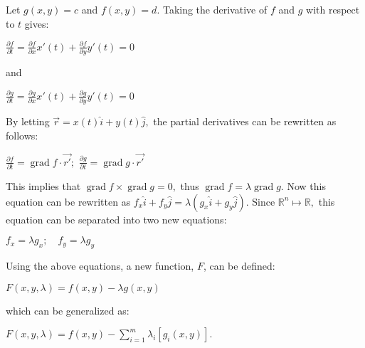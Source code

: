 \documentclass[12pt]{article}
\begin{document}
Let $g(x,y)=c$ and $f(x,y)=d$.  Taking the derivative of $f$ and $g$ with respect to $t$ gives:


\begin{center}$\displaystyle\frac{\partial f}{\partial t}=\frac{\partial f}{\partial x}x'(t)+\frac{\partial f}{\partial y}y'(t)=0$\end{center}

\begin{center}and\end{center}

\begin{center}$\displaystyle\frac{\partial g}{\partial t}=\frac{\partial g}{\partial x}x'(t)+\frac{\partial g}{\partial y}y'(t)=0$\end{center}

By letting $\vec{r}=x(t)\hat{i}+y(t)\hat{j},$ the partial derivatives can be rewritten as follows:

\begin{center}$\displaystyle\frac{\partial f}{\partial t}=\operatorname{grad} f\cdot \vec{r'};$ \quad $\displaystyle\frac{\partial g}{\partial t}=\operatorname{grad} g\cdot \vec{r'}$\end{center}

This implies that $\operatorname{grad} f \times \operatorname{grad} g = 0,$ thus $\operatorname{grad} f = \lambda \operatorname{grad} g.$  Now this equation can be rewritten as $f_x\hat{i}+f_y\hat{j}=\lambda\left(g_x\hat{i}+g_y\hat{j}\right).$  Since $\mathbb{R}^n\mapsto \mathbb{R},$ this equation can be separated into two new equations:

\begin{center}$\displaystyle f_x=\lambda g_x;\quad f_y=\lambda g_y$\end{center}

Using the above equations, a new function, $F$, can be defined:

\begin{center}$\displaystyle F(x,y,\lambda)=f(x,y)-\lambda g(x,y)$\end{center}

which can be generalized as:

\begin{center}$\displaystyle F(x,y,\lambda)=f(x,y)-\sum_{i=1}^m \lambda_i\left[g_i(x,y)\right].$\end{center}
\end{document}
